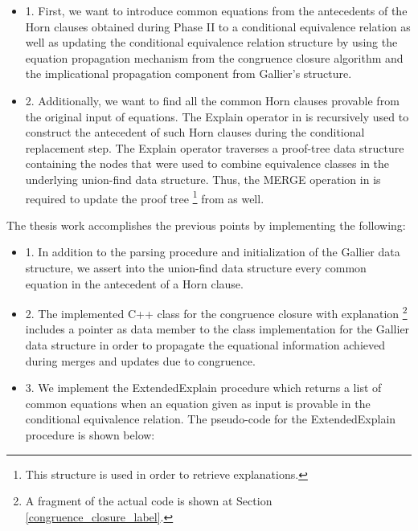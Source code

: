 \begin{itemize}
  \item[] 1. First, we want to introduce 
    common equations from the antecedents of 
    the Horn clauses obtained during Phase II
    to a conditional equivalence relation as well
    as updating the conditional equivalence relation 
    structure by using the equation propagation mechanism
    from the congruence closure algorithm and 
    the implicational propagation component 
    from Gallier's structure.
  \item[] 2. Additionally, we want to find all the common
    Horn clauses provable from the original input 
    of equations. The Explain operator in 
    \cite{10.1007/978-3-540-32033-3_33} is recursively 
    used to construct 
    the antecedent of such Horn clauses during the 
    conditional replacement step. The Explain operator 
    traverses a proof-tree data structure containing the nodes
    that were used to combine equivalence classes 
    in the underlying union-find data structure.
    Thus, the MERGE operation in \cite{GALLIER1987233} is
    required to update the proof tree 
    \footnote{This structure is used in order to retrieve
    explanations.}
    from \cite{10.1007/978-3-540-32033-3_33} as well.
\end{itemize}

The thesis work accomplishes the previous
points by implementing the following:

\begin{itemize}
  \item[] 1. In addition to the parsing procedure
    and initialization of the Gallier data structure,
    we assert into the union-find data structure 
    every common equation in the 
    antecedent of a Horn clause.
  \item[] 2. The implemented C++ class for 
    the congruence closure with explanation 
    \footnote{
      A fragment of the actual code is shown
      at Section \ref{congruence_closure_label}.
    } 
    includes a pointer as data member to the 
    class implementation
    for the Gallier data structure in order to propagate 
    the equational information achieved during
    merges and updates due to congruence.
  \item[] 3. We implement the ExtendedExplain 
    procedure which returns a list of common equations
    when an equation given as input is provable in the 
    conditional equivalence relation. The pseudo-code
    for the ExtendedExplain procedure is shown 
    below:
\end{itemize}

